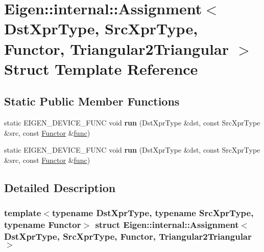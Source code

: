 \hypertarget{struct_eigen_1_1internal_1_1_assignment_3_01_dst_xpr_type_00_01_src_xpr_type_00_01_functor_00_01_triangular2_triangular_01_4}{}\section{Eigen\+:\+:internal\+:\+:Assignment$<$ Dst\+Xpr\+Type, Src\+Xpr\+Type, Functor, Triangular2\+Triangular $>$ Struct Template Reference}
\label{struct_eigen_1_1internal_1_1_assignment_3_01_dst_xpr_type_00_01_src_xpr_type_00_01_functor_00_01_triangular2_triangular_01_4}
\subsection*{Static Public Member Functions}
\begin{DoxyCompactItemize}
\item 
\mbox{\label{struct_eigen_1_1internal_1_1_assignment_3_01_dst_xpr_type_00_01_src_xpr_type_00_01_functor_00_01_triangular2_triangular_01_4_a99fcc5348b1bc536a1595c2a2f227112}} 
static E\+I\+G\+E\+N\+\_\+\+D\+E\+V\+I\+C\+E\+\_\+\+F\+U\+NC void {\bfseries run} (Dst\+Xpr\+Type \&dst, const Src\+Xpr\+Type \&src, const \hyperlink{struct_functor}{Functor} \&\hyperlink{structfunc}{func})
\item 
\mbox{\label{struct_eigen_1_1internal_1_1_assignment_3_01_dst_xpr_type_00_01_src_xpr_type_00_01_functor_00_01_triangular2_triangular_01_4_a99fcc5348b1bc536a1595c2a2f227112}} 
static E\+I\+G\+E\+N\+\_\+\+D\+E\+V\+I\+C\+E\+\_\+\+F\+U\+NC void {\bfseries run} (Dst\+Xpr\+Type \&dst, const Src\+Xpr\+Type \&src, const \hyperlink{struct_functor}{Functor} \&\hyperlink{structfunc}{func})
\end{DoxyCompactItemize}


\subsection{Detailed Description}
\subsubsection*{template$<$typename Dst\+Xpr\+Type, typename Src\+Xpr\+Type, typename Functor$>$\newline
struct Eigen\+::internal\+::\+Assignment$<$ Dst\+Xpr\+Type, Src\+Xpr\+Type, Functor, Triangular2\+Triangular $>$}



